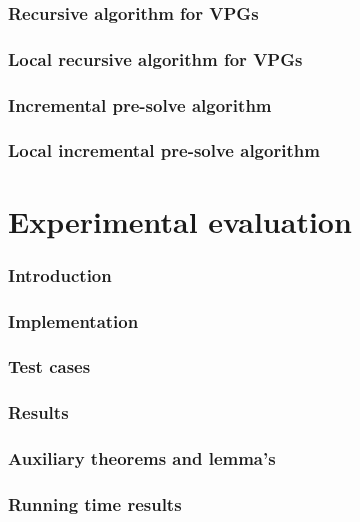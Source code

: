 \documentclass[]{article}
\begin{document}
\section{Recursive algorithm for VPGs}


\section{Local recursive algorithm for VPGs}


\section{Incremental pre-solve algorithm}


\section{Local incremental pre-solve algorithm}


\pagebreak
\part{Experimental evaluation}
\section{Introduction}


\section{Implementation}


\section{Test cases}


\section{Results}


\pagebreak
\begin{appendices}
\section{Auxiliary theorems and lemma's}
\label{appendix:proves}

\section{Running time results}
\label{appendix:resultsexact}

\end{appendices}

 

\end{document}
